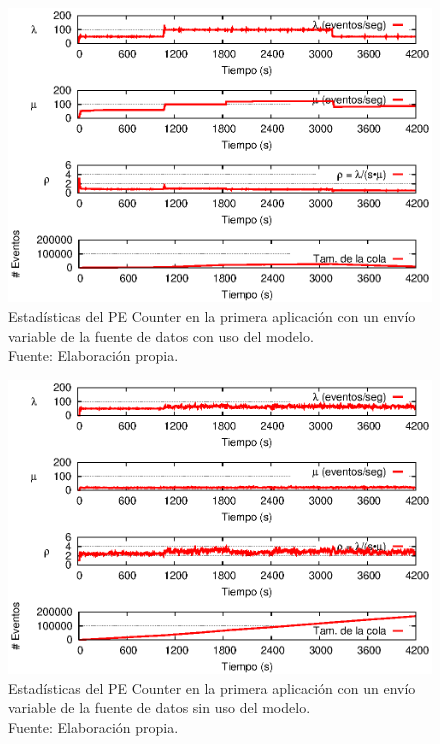 \begin{figure}[!ht]
    \centering
    \captionsetup{justification=centering}
    \includegraphics[scale=1]{images/exp/app1/normal/cm/statusCounterPE.eps}
    \caption[Estadísticas del PE Counter en la primera aplicación con un envío variable de la fuente de datos con uso del modelo.]{Estadísticas del PE Counter en la primera aplicación con un envío variable de la fuente de datos con uso del modelo.\\Fuente: Elaboración propia.}
    \label{fig:app1-normal-statusCounterPE-cm}
\end{figure}

\begin{figure}[!ht]
    \centering
    \captionsetup{justification=centering}
    \includegraphics[scale=1]{images/exp/app1/normal/sm/statusCounterPE.eps}
    \caption[Estadísticas del PE Counter en la primera aplicación con un envío variable de la fuente de datos sin uso del modelo.]{Estadísticas del PE Counter en la primera aplicación con un envío variable de la fuente de datos sin uso del modelo.\\Fuente: Elaboración propia.}
    \label{fig:app1-normal-statusCounterPE-sm}
\end{figure}


